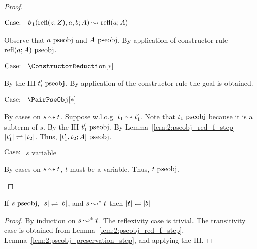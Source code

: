 \begin{proof}
\begin{proofcase}
        $\text{Case: }\begin{array}{c} \vartheta_1(\text{refl}(z; Z), a, b; A) \leadsto \text{refl}(a; A) \end{array}$
        \begin{proofcase}
            Observe that $a~\textnormal{pseobj}$ and $A~\textnormal{pseobj}$.
            By application of constructor rule $\text{refl}(a; A)~\textnormal{pseobj}$.
        \end{proofcase}

        $\text{Case: }\begin{array}{c} \ConstructorReduction[*] \end{array}$
        \begin{proofcase}
            By the IH $t_i^\prime~\textnormal{pseobj}$.
            By application of the constructor rule the goal is obtained.
        \end{proofcase}
    \end{proofcase}

    $\text{Case: }\begin{array}{c} \PairPseObj[*] \end{array}$
    \begin{proofcase}
        By cases on $s \leadsto t$.
        Suppose w.l.o.g. $t_1 \leadsto t_1^\prime$.
        Note that $t_1~\textnormal{pseobj}$ because it is a subterm of $s$.
        By the IH $t_1^\prime~\textnormal{pseobj}$.
        By Lemma~\ref{lem:2:pseobj_red_f_step} $|t_1^\prime| \rightleftharpoons |t_2|$.
        Thus, $[t_1^\prime, t_2; A]~\textnormal{pseobj}$.
    \end{proofcase}

    $\text{Case: }\begin{array}{c} s\text{ variable} \end{array}$
    \begin{proofcase}
        By cases on $s \leadsto t$, $t$ must be a variable.
        Thus, $t~\textnormal{pseobj}$.
    \end{proofcase}
\end{proof}

\begin{lemma}
    \label{lem:2:pseobj_red_f}
    If $s~\textnormal{pseobj}$, $|s| \rightleftharpoons |b|$, and $s \leadsto^* t$ then $|t| \rightleftharpoons |b|$
\end{lemma}
\begin{proof}
    By induction on $s \leadsto^* t$.
    The reflexivity case is trivial.
    The transitivity case is obtained from Lemma~\ref{lem:2:pseobj_red_f_step}, Lemma~\ref{lem:2:pseobj_preservation_step}, and applying the IH.
\end{proof}

